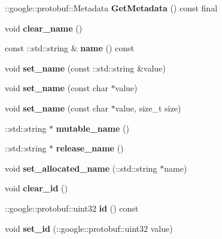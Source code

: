 \begin{DoxyCompactItemize}
\mbox{\label{classtbBasics_1_1SetCameraBody_a665a03ba4310bacd59640ba193441746}} 
\+::google\+::protobuf\+::\+Metadata {\bfseries Get\+Metadata} () const final
\item 
\mbox{\label{classtbBasics_1_1SetCameraBody_aca825e170387e42e42c8934053e9f74d}} 
void {\bfseries clear\+\_\+name} ()
\item 
\mbox{\label{classtbBasics_1_1SetCameraBody_a3978efa19acf8ab2c812897b5315c560}} 
const \+::std\+::string \& {\bfseries name} () const
\item 
\mbox{\label{classtbBasics_1_1SetCameraBody_a4ac54c9f06e862c57d5fd1960fbe3d72}} 
void {\bfseries set\+\_\+name} (const \+::std\+::string \&value)
\item 
\mbox{\label{classtbBasics_1_1SetCameraBody_a8fe3fb59328819845c4771f453b79b5f}} 
void {\bfseries set\+\_\+name} (const char $\ast$value)
\item 
\mbox{\label{classtbBasics_1_1SetCameraBody_aca47b155f9733a96c823c9c836c491f9}} 
void {\bfseries set\+\_\+name} (const char $\ast$value, size\+\_\+t size)
\item 
\mbox{\label{classtbBasics_1_1SetCameraBody_a5fe6d8a802f9685b5eeb4a73703b37da}} 
\+::std\+::string $\ast$ {\bfseries mutable\+\_\+name} ()
\item 
\mbox{\label{classtbBasics_1_1SetCameraBody_a316f2998608a62d6f5363ab3c78d4e76}} 
\+::std\+::string $\ast$ {\bfseries release\+\_\+name} ()
\item 
\mbox{\label{classtbBasics_1_1SetCameraBody_a204472f960fa0792ead5d7d562c7d888}} 
void {\bfseries set\+\_\+allocated\+\_\+name} (\+::std\+::string $\ast$name)
\item 
\mbox{\label{classtbBasics_1_1SetCameraBody_a9fea1681c03a20efb02f6f8fd4edfecf}} 
void {\bfseries clear\+\_\+id} ()
\item 
\mbox{\label{classtbBasics_1_1SetCameraBody_abf7808c84d5848d34a8568fa7f5fc2cb}} 
\+::google\+::protobuf\+::uint32 {\bfseries id} () const
\item 
\mbox{\label{classtbBasics_1_1SetCameraBody_af321c3d940c2810950967fbe0ac85e10}} 
void {\bfseries set\+\_\+id} (\+::google\+::protobuf\+::uint32 value)
\end{DoxyCompactItemize}
